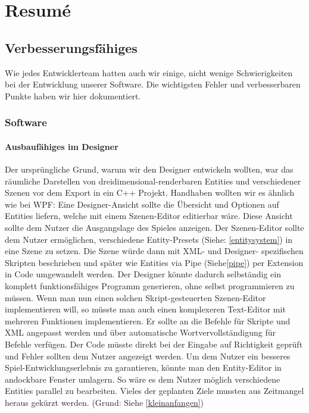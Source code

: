 \chapter{Resumé}

\section{Verbesserungsfähiges}
 Wie jedes Entwicklerteam hatten auch wir einige, nicht wenige Schwierigkeiten bei der Entwicklung unserer Software. Die wichtigsten Fehler und verbesserbaren Punkte haben wir hier dokumentiert.

\subsection{Software}
\subsubsection{Ausbaufähiges im Designer}
Der ursprüngliche Grund, warum wir den Designer entwickeln wollten, war das räumliche Darstellen von dreidimensional-renderbaren Entities und verschiedener Szenen vor dem Export in ein C++ Projekt. Handhaben wollten wir es ähnlich wie bei WPF: Eine Designer-Ansicht sollte die Übersicht und Optionen auf Entities liefern, welche mit einem Szenen-Editor editierbar wäre. Diese Ansicht sollte dem Nutzer die Ausgangslage des Spieles anzeigen.
Der Szenen-Editor sollte dem Nutzer ermöglichen, verschiedene Entity-Presets (Siehe: \cref{entitysystem}) in eine Szene zu setzen. Die Szene würde dann mit XML- und Designer- spezifischen Skripten beschrieben und später wie Entities via Pipe (Siehe\cref{pipe}) per Extension in Code umgewandelt werden.
Der Designer könnte dadurch selbständig ein komplett funktionsfähiges Programm generieren, ohne selbst programmieren zu müssen.
Wenn man nun einen solchen Skript-gesteuerten Szenen-Editor implementieren will, so müsste man auch einen komplexeren Text-Editor mit mehreren Funktionen implementieren. Er sollte an die Befehle für Skripte und XML angepasst werden und über automatische Wortvervollständigung für Befehle verfügen. Der Code müsste direkt bei der Eingabe auf Richtigkeit geprüft und Fehler sollten dem Nutzer angezeigt werden.
Um dem Nutzer ein besseres Spiel-Entwicklungserlebnis zu garantieren, könnte man den Entity-Editor in andockbare Fenster umlagern. So wäre es dem Nutzer möglich verschiedene Entities parallel zu bearbeiten.
Vieles der geplanten Ziele mussten aus Zeitmangel heraus gekürzt werden. (Grund: Siehe \cref{kleinanfangen})
	
